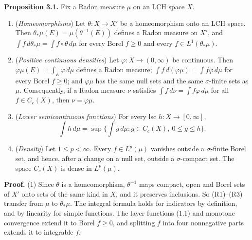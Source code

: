 \documentclass[
  english,
  11pt,
  a4paper,
]{article}
\providecommand{\tightlist}{%
  \setlength{\itemsep}{0pt}\setlength{\parskip}{0pt}}
\begin{document}
\textbf{Proposition 3.1.} Fix a Radon measure \(\mu\) on an LCH space
\(X\).

\begin{enumerate}
\tightlist
\item
  (\emph{Homeomorphisms}) Let \(\theta\colon X\to X'\) be a
  homeomorphism onto an LCH space. Then
  \(\theta_*\mu(E)=\mu(\theta^{-1}(E))\) defines a Radon measure on
  \(X'\), and \(\int f\,d\theta_*\mu=\int f\circ\theta\,d\mu\) for every
  Borel \(f\geq0\) and every \(f\in L^1(\theta_*\mu)\).
\item
  (\emph{Positive continuous densities}) Let
  \(\varphi\colon X\to(0,\infty)\) be continuous. Then
  \(\varphi\mu(E)=\int_E\varphi\,d\mu\) defines a Radon measure;
  \(\int f\,d(\varphi\mu)=\int f\varphi\,d\mu\) for every Borel
  \(f\geq0\); and \(\varphi\mu\) has the same null sets and the same
  \(\sigma\)-finite sets as \(\mu\). Consequently, if a Radon measure
  \(\nu\) satisfies \(\int f\,d\nu=\int f\varphi\,d\mu\) for all
  \(f\in C_c(X)\), then \(\nu=\varphi\mu\).
\item
  (\emph{Lower semicontinuous functions}) For every lsc
  \(h\colon X\to[0,\infty]\),
  \[\int h\,d\mu=\sup\Big\{\int g\,d\mu:g\in C_c(X),\ 0\leq g\leq h\Big\}.
  \tag{3.1}\]
\item
  (\emph{Density}) Let \(1\leq p<\infty\). Every \(f\in L^p(\mu)\)
  vanishes outside a \(\sigma\)-finite Borel set, and hence, after a
  change on a null set, outside a \(\sigma\)-compact set. The space
  \(C_c(X)\) is dense in \(L^p(\mu)\).
\end{enumerate}

\textbf{Proof.} (1) Since \(\theta\) is a homeomorphism, \(\theta^{-1}\)
maps compact, open and Borel sets of \(X'\) onto sets of the same kind
in \(X\), and it preserves inclusions. So (R1)--(R3) transfer from
\(\mu\) to \(\theta_*\mu\). The integral formula holds for indicators by
definition, and by linearity for simple functions. The layer functions
(1.1) and monotone convergence extend it to Borel \(f\geq0\), and
splitting \(f\) into four nonnegative parts extends it to integrable
\(f\).
\end{document}
